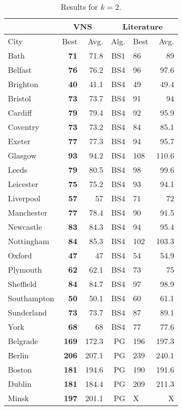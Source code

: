 \documentclass[dvipsnames,format=sigconf,anonymous=true,review=true]{acmart}
\begin{document}
\begin{table}
	\caption{Results for $k=2$.}
	\label{tab:k2}  
	\begin{tabular}{l|rr|rlr}
		\hline
		\multicolumn{1}{c}{ } & \multicolumn{2}{|c}{VNS} & \multicolumn{3}{|c}{Literature} \\
		\hline
		City & Best & Avg. & Alg. & Best & Avg. \\ \hline
		Bath&\bf{71}&71.8&BS1&86&89\\
		Belfast&\bf{76}&76.2&BS4&96&97.6\\
		Brighton&\bf{40}&41.1&BS4&49&49.4\\
		Bristol&\bf{73}&73.7&BS4&91&94\\
		Cardiff&\bf{79}&79.4&BS4&92&95.9\\
		Coventry&\bf{73}&73.2&BS4&84&85.1\\
		Exeter&\bf{77}&77.3&BS4&94&95.7\\
		Glasgow&\bf{93}&94.2&BS4&108&110.6\\
		Leeds&\bf{79}&80.5&BS4&98&99.6\\
		Leicester&\bf{75}&75.2&BS4&93&94.1\\
		Liverpool&\bf{57}&57&BS4&71&72\\
		Manchester&\bf{77}&78.4&BS4&90&91.5\\
		Newcastle&\bf{83}&84.3&BS4&94&95.4\\
		Nottingham&\bf{84}&85.3&BS4&102&103.3\\
		Oxford&\bf{47}&47&BS4&54&54.9\\
		Plymouth&\bf{62}&62.1&BS4&73&75\\
		Sheffield&\bf{84}&84.7&BS4&97&98.9\\
		Southampton&\bf{50}&50.1&BS4&60&61.1\\
		Sunderland&\bf{73}&73.7&BS4&87&89.1\\
		York&\bf{68}&68&BS4&77&77.6\\ \hline \hline
		Belgrade&\bf{169}&172.3&PG&196&197.3\\
		Berlin&\bf{206}&207.1&PG&239&240.1\\
		Boston&\bf{181}&194.6&PG&190&191.6\\
		Dublin&\bf{181}&184.4&PG&209&211.3\\
		Minsk&\bf{197}&201.1&PG&X&X\\
		\hline
	\end{tabular}
\end{table}
\end{document}

